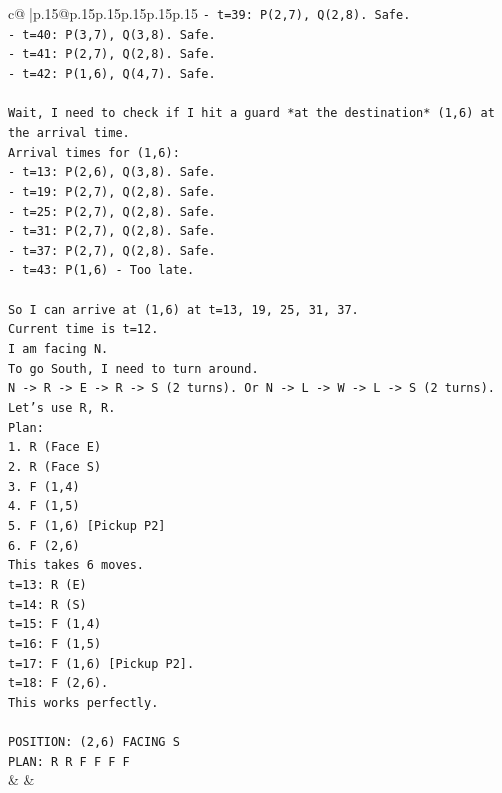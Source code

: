 \documentclass{article}
\begin{document}
{\begin{supertabular}{c@{$\;$}|p{.15\linewidth}@{}p{.15\linewidth}p{.15\linewidth}p{.15\linewidth}p{.15\linewidth}p{.15\linewidth}}
{{{\texttt{{-} t=39: P(2,7), Q(2,8). Safe.} \\
\texttt{{-} t=40: P(3,7), Q(3,8). Safe.} \\
\texttt{{-} t=41: P(2,7), Q(2,8). Safe.} \\
\texttt{{-} t=42: P(1,6), Q(4,7). Safe.} \\
\\ 
\texttt{Wait, I need to check if I hit a guard *at the destination* (1,6) at the arrival time.} \\
\texttt{Arrival times for (1,6):} \\
\texttt{{-} t=13: P(2,6), Q(3,8). Safe.} \\
\texttt{{-} t=19: P(2,7), Q(2,8). Safe.} \\
\texttt{{-} t=25: P(2,7), Q(2,8). Safe.} \\
\texttt{{-} t=31: P(2,7), Q(2,8). Safe.} \\
\texttt{{-} t=37: P(2,7), Q(2,8). Safe.} \\
\texttt{{-} t=43: P(1,6) {-} Too late.} \\
\\ 
\texttt{So I can arrive at (1,6) at t=13, 19, 25, 31, 37.} \\
\texttt{Current time is t=12.} \\
\texttt{I am facing N.} \\
\texttt{To go South, I need to turn around.} \\
\texttt{N {-}> R {-}> E {-}> R {-}> S (2 turns). Or N {-}> L {-}> W {-}> L {-}> S (2 turns).} \\
\texttt{Let's use R, R.} \\
\texttt{Plan:} \\
\texttt{1. R (Face E)} \\
\texttt{2. R (Face S)} \\
\texttt{3. F (1,4)} \\
\texttt{4. F (1,5)} \\
\texttt{5. F (1,6) {[}Pickup P2{]}} \\
\texttt{6. F (2,6)} \\
\texttt{This takes 6 moves.} \\
\texttt{t=13: R (E)} \\
\texttt{t=14: R (S)} \\
\texttt{t=15: F (1,4)} \\
\texttt{t=16: F (1,5)} \\
\texttt{t=17: F (1,6) {[}Pickup P2{]}.} \\
\texttt{t=18: F (2,6).} \\
\texttt{This works perfectly.} \\
\\ 
\texttt{POSITION: (2,6) FACING S} \\
\texttt{PLAN: R R F F F F} \\
            }
        }
    }
    & & \\ \\


\end{supertabular}}
\end{document}
